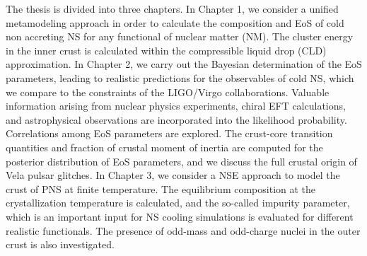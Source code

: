 The thesis is divided into three chapters. 
In Chapter 1, we consider a unified
metamodeling approach in order to calculate the composition and EoS of cold non
accreting NS for any functional of nuclear matter (NM). The cluster energy in
the inner crust is calculated within the compressible liquid drop (CLD)
approximation. 
In Chapter 2, we carry out the Bayesian determination of the EoS 
parameters, leading to realistic predictions for the observables of cold NS,
which we compare to the constraints of the LIGO/Virgo collaborations.
Valuable information arising from nuclear physics experiments, chiral EFT 
calculations, and astrophysical observations are incorporated into the 
likelihood probability. Correlations among EoS parameters are 
explored. The crust-core transition quantities and fraction of crustal moment
of inertia are computed for the posterior distribution of EoS parameters, and 
we discuss the full crustal origin of Vela pulsar glitches.
In Chapter 3, we consider a NSE approach to model the crust of PNS at 
finite temperature. The equilibrium composition at the crystallization 
temperature is calculated, and the so-called impurity parameter, which is an 
important input for NS cooling simulations is evaluated for different realistic 
functionals. The presence of odd-mass and odd-charge nuclei in the outer crust
is also investigated.

\clearpage\thispagestyle{empty}
